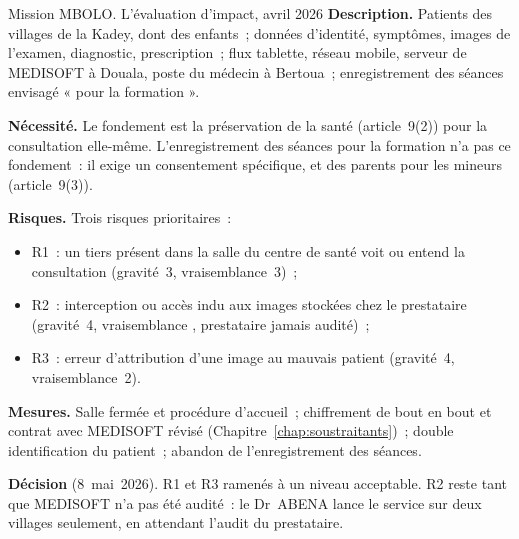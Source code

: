 \begin{boxscenario}{Mission MBOLO. L'évaluation d'impact, avril 2026}
\textbf{Description.} Patients des villages de la Kadey, dont des enfants~;
données d'identité, symptômes, images de l'examen, diagnostic,
prescription~; flux tablette, réseau mobile, serveur de MEDISOFT à Douala,
poste du médecin à Bertoua~; enregistrement des séances envisagé « pour la
formation ».

\textbf{Nécessité.} Le fondement est la préservation de la santé
(article~9(2)) pour la consultation elle-même. L'enregistrement des séances
pour la formation n'a pas ce fondement~: il exige un consentement
spécifique, et des parents pour les mineurs (article~9(3)).

\textbf{Risques.} Trois risques prioritaires~:
\begin{itemize}
    \item R1~: un tiers présent dans la salle du centre de santé voit ou
          entend la consultation (gravité~3, vraisemblance~3)~;
    \item R2~: interception ou accès indu aux images stockées chez le
          prestataire (gravité~4, vraisemblance \NEK{}, prestataire jamais
          audité)~;
    \item R3~: erreur d'attribution d'une image au mauvais patient
          (gravité~4, vraisemblance~2).
\end{itemize}

\textbf{Mesures.} Salle fermée et procédure d'accueil~; chiffrement de bout
en bout et contrat avec MEDISOFT révisé (Chapitre~\ref{chap:soustraitants})~;
double identification du patient~; abandon de l'enregistrement des
séances.

\textbf{Décision} (8~mai~2026). R1 et R3 ramenés à un niveau acceptable.
R2 reste \NEK{} tant que MEDISOFT n'a pas été audité~: le Dr~ABENA lance le
service sur deux villages seulement, en attendant l'audit du prestataire.
\end{boxscenario}

